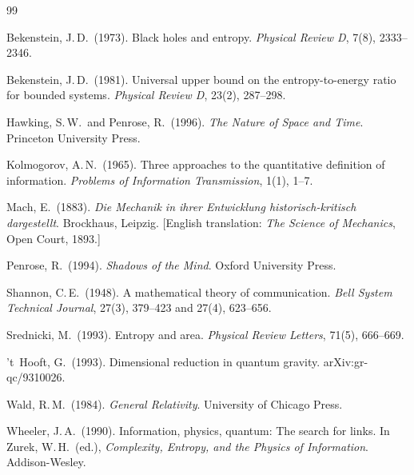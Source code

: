 \documentclass[12pt]{article}
\begin{document}
\begin{thebibliography}{99}

        Bekenstein, J.\,D.\ (1973).
        Black holes and entropy.
        \textit{Physical Review D}, 7(8), 2333--2346.

        Bekenstein, J.\,D.\ (1981).
        Universal upper bound on the entropy-to-energy ratio for
        bounded systems.
        \textit{Physical Review D}, 23(2), 287--298.

        Hawking, S.\,W.\ and Penrose, R.\ (1996).
        \textit{The Nature of Space and Time}.
        Princeton University Press.

        Kolmogorov, A.\,N.\ (1965).
        Three approaches to the quantitative definition of information.
        \textit{Problems of Information Transmission}, 1(1), 1--7.

        Mach, E.\ (1883).
        \textit{Die Mechanik in ihrer Entwicklung historisch-kritisch
        dargestellt}.
        Brockhaus, Leipzig.
        [English translation: \textit{The Science of Mechanics},
        Open Court, 1893.]

        Penrose, R.\ (1994).
        \textit{Shadows of the Mind}.
        Oxford University Press.

        Shannon, C.\,E.\ (1948).
        A mathematical theory of communication.
        \textit{Bell System Technical Journal},
        27(3), 379--423 and 27(4), 623--656.

        Srednicki, M.\ (1993).
        Entropy and area.
        \textit{Physical Review Letters}, 71(5), 666--669.

        't~Hooft, G.\ (1993).
        Dimensional reduction in quantum gravity.
        arXiv:gr-qc/9310026.

        Wald, R.\,M.\ (1984).
        \textit{General Relativity}.
        University of Chicago Press.

        Wheeler, J.\,A.\ (1990).
        Information, physics, quantum: The search for links.
        In Zurek, W.\,H.\ (ed.),
        \textit{Complexity, Entropy, and the Physics of Information}.
        Addison-Wesley.

\end{thebibliography}

\end{document}
